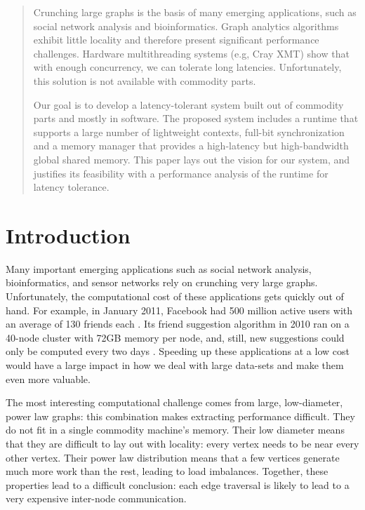 \documentclass[10pt,nocopyrightspace,preprint]{sigplanconf}
\begin{document}
\begin{abstract}
   Crunching large graphs is the basis of many emerging applications,
   such as social network analysis and bioinformatics. Graph analytics
   algorithms exhibit little locality and therefore present significant
   performance challenges. Hardware multithreading systems (e.g, Cray
   XMT) show that with enough concurrency, we can tolerate long
   latencies. Unfortunately, this solution is not available with
   commodity parts.
 
   Our goal is to develop a latency-tolerant system built out of
   commodity parts and mostly in software. The proposed system includes
   a runtime that supports a large number of lightweight contexts,
   full-bit synchronization and a memory manager that provides a
   high-latency but high-bandwidth global shared memory. This paper
   lays out the vision for our system, and justifies its feasibility
   with a performance analysis of the runtime for latency tolerance.
 
\end{abstract}

\section{Introduction}

Many important emerging applications such as social network analysis,
bioinformatics, and sensor networks rely on crunching very large
graphs. Unfortunately, the computational cost of these applications
gets quickly out of hand. For example, in January 2011, Facebook had
500 million active users with an average of 130 friends each
\cite{Facebook:2011p91}. Its friend suggestion algorithm in 2010 ran on
  a 40-node cluster with 72GB memory per node, and, still, new
  suggestions could only be computed every two days
  \cite{Backstrom:2010p90}. Speeding up these applications at a low
  cost would have a large impact in how we deal with large data-sets and make them even more valuable.



The most interesting computational challenge comes from large,
low-diameter, power law graphs: this combination makes extracting
performance difficult. They do not fit in a single
commodity machine's memory. Their low diameter means that they are
difficult to lay out with locality: every vertex needs to be near every
other vertex. Their power law distribution means that a few vertices
generate much more work than the rest, leading to load
imbalances. Together, these properties lead to a
difficult conclusion: each edge traversal is likely to lead to a very
expensive inter-node communication.
\end{document}
